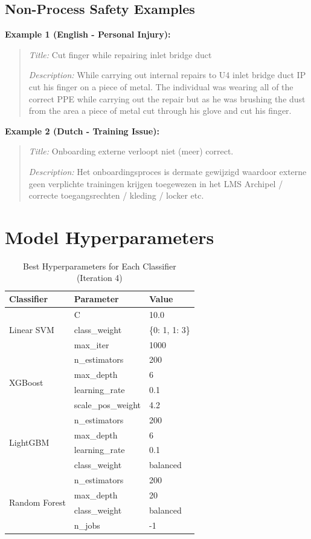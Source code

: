 \documentclass[11pt, titlepage, bibliography=totoc]{scrreprt}
\begin{document}
\subsection{Non-Process Safety Examples}

\textbf{Example 1 (English - Personal Injury):}
\begin{quote}
\textit{Title:} Cut finger while repairing inlet bridge duct

\textit{Description:} While carrying out internal repairs to U4 inlet bridge duct IP cut his finger on a piece of metal. The individual was wearing all of the correct PPE while carrying out the repair but as he was brushing the dust from the area a piece of metal cut through his glove and cut his finger.
\end{quote}

\textbf{Example 2 (Dutch - Training Issue):}
\begin{quote}
\textit{Title:} Onboarding externe verloopt niet (meer) correct.

\textit{Description:} Het onboardingsproces is dermate gewijzigd waardoor externe geen verplichte trainingen krijgen toegewezen in het LMS Archipel / correcte toegangsrechten / kleding / locker etc.
\end{quote}

\section{Model Hyperparameters}

\begin{table}[htbp]
\centering
\caption{Best Hyperparameters for Each Classifier (Iteration 4)}
\label{tab:appendix-hyperparams}
\begin{tabular}{@{}llp{8cm}@{}}
\toprule
\textbf{Classifier} & \textbf{Parameter} & \textbf{Value} \\
\midrule
\multirow{3}{*}{Linear SVM} & C & 10.0 \\
 & class\_weight & \{0: 1, 1: 3\} \\
 & max\_iter & 1000 \\
\midrule
\multirow{4}{*}{XGBoost} & n\_estimators & 200 \\
 & max\_depth & 6 \\
 & learning\_rate & 0.1 \\
 & scale\_pos\_weight & 4.2 \\
\midrule
\multirow{4}{*}{LightGBM} & n\_estimators & 200 \\
 & max\_depth & 6 \\
 & learning\_rate & 0.1 \\
 & class\_weight & balanced \\
\midrule
\multirow{4}{*}{Random Forest} & n\_estimators & 200 \\
 & max\_depth & 20 \\
 & class\_weight & balanced \\
 & n\_jobs & -1 \\
\bottomrule
\end{tabular}
\end{table}
\end{document}
